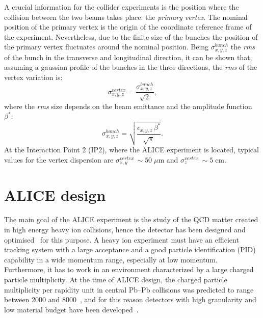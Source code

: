 A crucial information for the collider experiments is the position where the collision
between the two beams takes place: the \textit{primary vertex}. 
The nominal position of the primary vertex is the origin of the coordinate reference frame of the 
experiment. Nevertheless, due to the finite size of the bunches the position of the primary
vertex fluctuates around the nominal position.
Being $\sigma^{bunch}_{x,y,z}$ the \textit{rms} of the bunch in the transverse and longitudinal
direction, it can be shown that, assuming a gaussian profile of the bunches in the three directions,
the \textit{rms} of the vertex variation is:
\begin{equation}
    \sigma^{vertex}_{x,y,z} = \frac{\sigma^{bunch}_{x,y,z}}{\sqrt{2}},
\end{equation}
where the \textit{rms} size depends on the beam emittance and the amplitude function $\beta^{*}$:
\begin{equation}
    \sigma^{bunch}_{x,y,z} = \sqrt{\frac{\epsilon_{x,y,z}\,\beta^{*}}{\sqrt{\pi}}}.
\end{equation}
At the Interaction Point 2 (IP2), where the ALICE experiment is located, typical values for the vertex dispersion are 
$\sigma^{vertex}_{x,y}\,\sim 50\;\mu\mathrm{m}$ and $\sigma^{vertex}_{z}\,\sim 5\;\mathrm{cm}$.

%
%
\section{ALICE design} \label{sec:3.2}

The main goal of the ALICE experiment is the study of the QCD matter created in high energy heavy
ion collisions, hence the detector has been designed and optimised~\cite{alicedesign1,alicedesign2}
for this purpose.
A heavy ion experiment must have an efficient tracking system with a large acceptance and a good
particle identification (PID) capability in a wide momentum range, especially at low momentum.
Furthermore, it has to work in an environment characterized by a large charged particle multiplicity.
At the time of ALICE design, the charged particle multiplicity per rapidity unit in central Pb–Pb 
collisions was predicted to range between 2000 and 8000~\cite{alicemulti}, and for this reason
detectors with high granularity and low material budget have been 
developed~\cite{alicedesign1,alicedesign2}.

